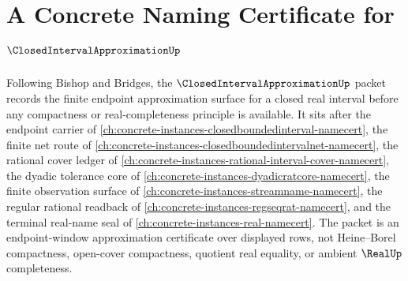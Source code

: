 \chapter{A Concrete Naming Certificate for $\ClosedIntervalApproximationUp$}
\label{ch:concrete-instances-closed-interval-approximation-namecert}

Following Bishop and Bridges, the $\ClosedIntervalApproximationUp$ packet records the finite endpoint approximation surface for a closed real interval before any compactness or real-completeness principle is available. It sits after the endpoint carrier of \autoref{ch:concrete-instances-closedboundedinterval-namecert}, the finite net route of \autoref{ch:concrete-instances-closedboundedintervalnet-namecert}, the rational cover ledger of \autoref{ch:concrete-instances-rational-interval-cover-namecert}, the dyadic tolerance core of \autoref{ch:concrete-instances-dyadicratcore-namecert}, the finite observation surface of \autoref{ch:concrete-instances-streamname-namecert}, the regular rational readback of \autoref{ch:concrete-instances-regseqrat-namecert}, and the terminal real-name seal of \autoref{ch:concrete-instances-real-namecert}. The packet is an endpoint-window approximation certificate over displayed rows, not Heine--Borel compactness, open-cover compactness, quotient real equality, or ambient $\RealUp$ completeness.

